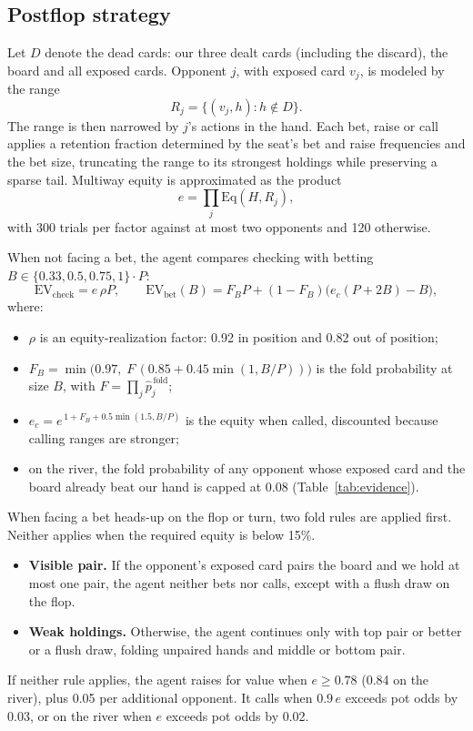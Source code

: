 \documentclass[10pt]{article}
\begin{document}
\subsection{Postflop strategy}
Let $D$ denote the dead cards: our three dealt cards (including the discard), the board and all exposed cards. Opponent $j$, with exposed card $v_j$, is modeled by the range
\[
R_j=\{(v_j,h):h\notin D\}.
\]
The range is then narrowed by $j$'s actions in the hand. Each bet, raise or call applies a retention fraction determined by the seat's bet and raise frequencies and the bet size, truncating the range to its strongest holdings while preserving a sparse tail. Multiway equity is approximated as the product
\[
e=\prod_j \mathrm{Eq}(H,R_j),
\]
with 300 trials per factor against at most two opponents and 120 otherwise.

When not facing a bet, the agent compares checking with betting $B\in\{0.33,0.5,0.75,1\}\cdot P$:
\[
\mathrm{EV}_{\text{check}}=e\,\rho P,\qquad
\mathrm{EV}_{\text{bet}}(B)=F_B P+(1-F_B)\big(e_c(P+2B)-B\big),
\]
where:
\begin{itemize}
\item $\rho$ is an equity-realization factor: 0.92 in position and 0.82 out of position;
\item $F_B=\min\!\big(0.97,\;F\,(0.85+0.45\min(1,B/P))\big)$ is the fold probability at size $B$, with $F=\prod_j\hat p_j^{\,\text{fold}}$;
\item $e_c=e^{\,1+F_B+0.5\min(1.5,B/P)}$ is the equity when called, discounted because calling ranges are stronger;
\item on the river, the fold probability of any opponent whose exposed card and the board already beat our hand is capped at 0.08 (Table~\ref{tab:evidence}).
\end{itemize}

When facing a bet heads-up on the flop or turn, two fold rules are applied first. Neither applies when the required equity is below 15\%.
\begin{itemize}
\item \textbf{Visible pair.} If the opponent's exposed card pairs the board and we hold at most one pair, the agent neither bets nor calls, except with a flush draw on the flop.
\item \textbf{Weak holdings.} Otherwise, the agent continues only with top pair or better or a flush draw, folding unpaired hands and middle or bottom pair.
\end{itemize}
If neither rule applies, the agent raises for value when $e\ge0.78$ (0.84 on the river), plus 0.05 per additional opponent. It calls when $0.9\,e$ exceeds pot odds by 0.03, or on the river when $e$ exceeds pot odds by 0.02.
\end{document}
